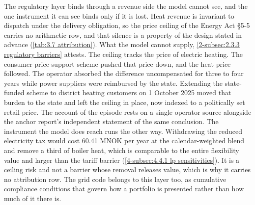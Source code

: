 The regulatory layer binds through a revenue side the model cannot see, and the one instrument it can see binds only if it is lost. Heat revenue is invariant to dispatch under the delivery obligation, so the price ceiling of the Energy Act \S5-5 carries no arithmetic row, and that silence is a property of the design stated in advance (\autoref{tab:3.7 attribution}). What the model cannot supply, \autoref{2-subsec:2.3.3 regulatory barriers} attests. The ceiling tracks the price of electric heating. The consumer price-support scheme pushed that price down, and the heat price followed. The operator absorbed the difference uncompensated for three to four years while power suppliers were reimbursed by the state. Extending the state-funded scheme to district heating customers on 1 October 2025 moved that burden to the state and left the ceiling in place, now indexed to a politically set retail price. The account of the episode rests on a single operator source alongside the anchor report's independent statement of the same conclusion. The instrument the model does reach runs the other way. Withdrawing the reduced electricity tax would cost 60.41 MNOK per year at the calendar-weighted blend and remove a third of boiler heat, which is comparable to the entire flexibility value and larger than the tariff barrier (\autoref{4-subsec:4.4.1 lp sensitivities}). It is a ceiling risk and not a barrier whose removal releases value, which is why it carries no attribution row. The grid code belongs to this layer too, as cumulative compliance conditions that govern how a portfolio is presented rather than how much of it there is.

